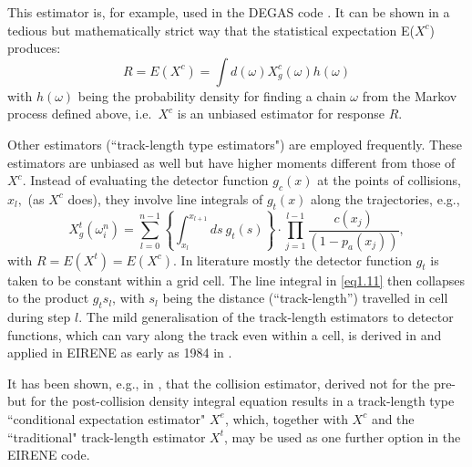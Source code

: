 This estimator is, for example, used in the DEGAS code \cite{kn:Heifetz}.
It can be shown \cite{kn:Spanier69a} in a tedious but mathematically strict way
that the statistical expectation E($X^c$) produces:
\begin{equation}
  \label{eq1.10}
  R = E(X^c ) = \int  d( \omega )   X^c_g ( \omega ) h( \omega )
\end{equation}
with $h(\omega)$ being the probability density for finding a chain $\omega$
from the Markov process defined above, i.e.\ $X^c$ is an unbiased estimator for
response $R$.

Other estimators (``track-length type estimators") are employed frequently.
These estimators are unbiased as well but have higher moments different from
those of $ X^c$.
Instead of evaluating the detector function $ g_c(x)$ at the points of
collisions, $ x_l, $ (as $ X^c$ does), they involve line integrals of $ g_t(x)$
along the trajectories, e.g.,
\begin{equation}
  \label{eq1.11} X^t_g (
  \omega^{n}_i ) = \sum_{l=0}^{n-1}   \left \{ \int_{x_l}^{x_{l+1}} ds \	g_t (s)
  \right \} \cdot   \prod_{j=1}^{l-1} \frac{c(x_j )}{(1 - p_a(x_j))},
\end{equation}
with $ R = E(X^t ) = E(X^c)$.
In literature mostly the detector function $g_t$ is taken to be constant within
a grid cell.
The line integral in \cref{eq1.11} then collapses to the product $g_t s_l$,
with $s_l$ being the distance (``track-length'') travelled in cell during step
$l$.
The mild generalisation of the track-length estimators to detector functions,
which can vary along the track even within a cell, is derived in
\cite{kn:Reiter84a} and applied in EIRENE as early as 1984 in
\cite{kn:Reiter84b}.

It has been shown, e.g., in \cite{kn:Spanier69a}, that the collision estimator,
derived not for the pre- but for the post-collision density integral equation
results in a track-length type ``conditional expectation estimator" $ X^e$,
which, together with $X^c$ and the ``traditional" track-length estimator $
  X^t$, may be used as one further option in the EIRENE code.

